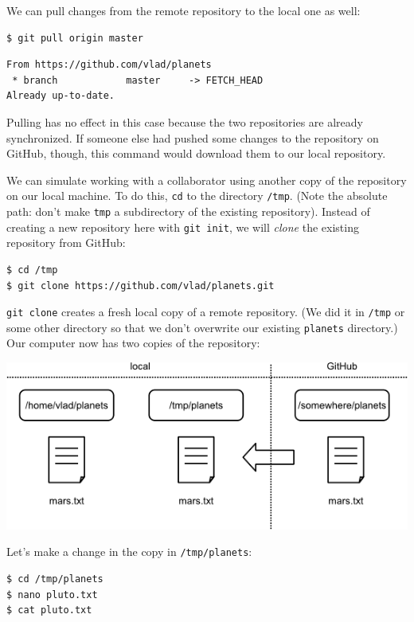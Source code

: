 \documentclass[]{book}
\newcommand{\gdef}[2]{\emph{#2}}
\begin{document}
We can pull changes from the remote repository to the local one as well:

\begin{verbatim}
$ git pull origin master
\end{verbatim}

\begin{verbatim}
From https://github.com/vlad/planets
 * branch            master     -> FETCH_HEAD
Already up-to-date.
\end{verbatim}

Pulling has no effect in this case because the two repositories are
already synchronized. If someone else had pushed some changes to the
repository on GitHub, though, this command would download them to our
local repository.

We can simulate working with a collaborator using another copy of the
repository on our local machine. To do this, \texttt{cd} to the
directory \texttt{/tmp}. (Note the absolute path: don't make
\texttt{tmp} a subdirectory of the existing repository). Instead of
creating a new repository here with \texttt{git init}, we will
\gdef{g:repository-clone}{clone} the existing repository from
GitHub:

\begin{verbatim}
$ cd /tmp
$ git clone https://github.com/vlad/planets.git
\end{verbatim}

\texttt{git clone} creates a fresh local copy of a remote repository.
(We did it in \texttt{/tmp} or some other directory so that we don't
overwrite our existing \texttt{planets} directory.) Our computer now has
two copies of the repository:

\includegraphics{novice/git/img/git-after-duplicate-clone.png}

Let's make a change in the copy in \texttt{/tmp/planets}:

\begin{verbatim}
$ cd /tmp/planets
$ nano pluto.txt
$ cat pluto.txt
\end{verbatim}
\end{document}
